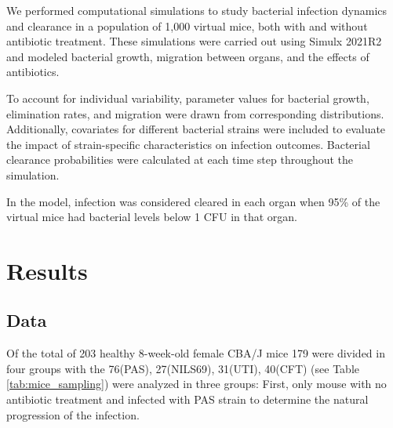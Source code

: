 \documentclass{article}
\begin{document}
We performed computational simulations to study bacterial infection dynamics and clearance in a population of 1,000 virtual mice, both with and without antibiotic treatment. These simulations were carried out using Simulx 2021R2 and modeled bacterial growth, migration between organs, and the effects of antibiotics.

To account for individual variability, parameter values for bacterial growth, elimination rates, and migration were drawn from corresponding distributions. Additionally, covariates for different bacterial strains were included to evaluate the impact of strain-specific characteristics on infection outcomes. Bacterial clearance probabilities were calculated at each time step throughout the simulation.

In the model, infection was considered cleared in each organ when 95\% of the virtual mice had bacterial levels below 1 CFU in that organ.





\section{Results}

\subsection{Data}


Of the total of 203 healthy 8-week-old female CBA/J mice 179 were divided in four groups with the 76(PAS), 27(NILS69), 31(UTI), 40(CFT) (see Table \ref{tab:mice_sampling}) were analyzed in three groups: First, only mouse with no antibiotic treatment and infected with PAS strain to determine the natural progression of the infection. 

\end{document}
